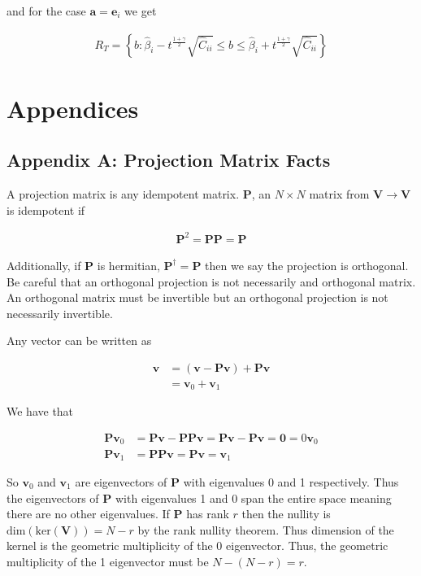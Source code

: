 \documentclass[12pt]{article}
\newcommand{\bv}[1]{\boldsymbol{#1}}
\begin{document}
and for the case $\bv{a} = \bv{e}_i$ we get

\begin{align}
R_T = \left\{b: \hat{\beta}_i - t^{\frac{1+\gamma}{2}} \sqrt{\hat{C}_{ii}} \le b \le \hat{\beta}_i + t^{\frac{1+\gamma}{2}}\sqrt{\hat{C}_{ii}}\right\}
\end{align}

\section{Appendices}

\subsection{Appendix A: Projection Matrix Facts}

A projection matrix is any idempotent matrix. $\bv{P}$, an $N\times N$ matrix from $\bv{V} \rightarrow \bv{V}$ is idempotent if

\begin{align}
\bv{P}^2 = \bv{P}\bv{P} = \bv{P}
\end{align}

Additionally, if $\bv{P}$ is hermitian, $\bv{P}^{\dag} = \bv{P}$ then we say the projection is orthogonal. Be careful that an orthogonal projection is not necessarily and orthogonal matrix. An orthogonal matrix must be invertible but an orthogonal projection is not necessarily invertible.

Any vector can be written as

\begin{align}
\bv{v} &= (\bv{v} - \bv{P}\bv{v}) + \bv{P}\bv{v}\\
&= \bv{v}_0 + \bv{v}_1
\end{align}

We have that

\begin{align}
\bv{P}\bv{v}_0 &= \bv{P}\bv{v} - \bv{P}\bv{P}\bv{v} = \bv{P}\bv{v} - \bv{P}\bv{v} = \bv{0} = 0 \bv{v}_0\\
\bv{P}\bv{v}_1 &= \bv{P}\bv{P}\bv{v} = \bv{P}\bv{v} = \bv{v}_1
\end{align}

So $\bv{v}_0$ and $\bv{v}_1$ are eigenvectors of $\bv{P}$ with eigenvalues 0 and 1 respectively.
Thus the eigenvectors of $\bv{P}$ with eigenvalues 1 and 0 span the entire space meaning there are no other eigenvalues.
If $\bv{P}$ has rank $r$ then the nullity is $\text{dim}(\text{ker}(\bv{V})) = N-r$ by the rank nullity theorem.
Thus dimension of the kernel is the geometric multiplicity of the $0$ eigenvector.
Thus, the geometric multiplicity of the 1 eigenvector must be $N - (N-r) = r$.
\end{document}
